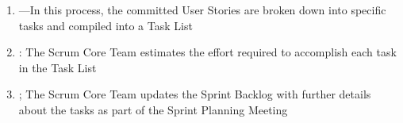 \documentclass[letterpaper,10pt,english]{jupyterBook}
\begin{document}
\begin{enumerate}
%
\setcounter{enumi}{3}
\item {} 
\sphinxAtStartPar
{}—In this process, the committed User Stories are broken down into specific tasks and compiled into a Task List

\item {} 
\sphinxAtStartPar
{}: The Scrum Core Team estimates the effort required to accomplish each task in the Task List

\item {} 
\sphinxAtStartPar
{}; The Scrum Core Team updates the Sprint Backlog with further details about the tasks as part of the Sprint Planning Meeting

\end{enumerate}
\end{document}

